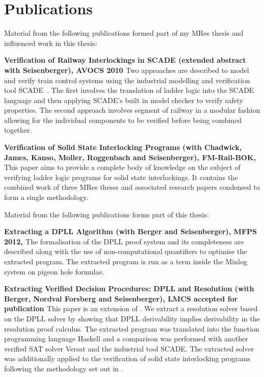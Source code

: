 \section{Publications}
Material from the following publications formed part of my MRes thesis and influenced work in this thesis:

\textbf{Verification of Railway Interlockings in SCADE (extended abstract with Seisenberger), AVOCS 2010 \cite{AL10}} 
Two approaches are described to model and verify train control systems using the industrial modelling and verification tool SCADE~\cite{Scade}. The first involves the translation of ladder logic into the SCADE language and then applying SCADE's built in model checker to verify safety properties. The second approach involves segment of railway in a modular fashion allowing for the individual components to be verified before being combined together.


\textbf{Verification of Solid State Interlocking Programs (with Chadwick, James, Kanso, Moller, Roggenbach and Seisenberger), FM-Rail-BOK, \cite{AL14a}}
This paper aims to provide a complete body of knowledge on the subject of verifying ladder logic programs for solid state interlockings. It contains the combined work of three MRes theses and associated research papers condensed to form a single methodology.

Material from the following publications forms part of this thesis:

\textbf{Extracting a DPLL Algorithm (with Berger and Seisenberger), MFPS 2012, \cite{AL12}}
The formalisation of the DPLL proof system and its completeness are described along with the use of non-computational quantifiers to optimise the extracted program. The extracted program is run as a term inside the Minlog system on pigeon hole formulae.


\textbf{Extracting Verified Decision Procedures: DPLL and Resolution (with Berger, Nordval Forsberg and Seisenberger), LMCS accepted for publication \cite{AL14b}}
This paper is an extension of \cite{AL12}. We extract a resolution solver based on the DPLL solver by showing that DPLL derivability implies derivability in the resolution proof calculus. The extracted program was translated into the function programming language Haskell and a comparison was performed with another verified SAT solver Versat and the industrial tool SCADE. The extracted solver was additionally applied to the verification of solid state interlocking programs following the methodology set out in \cite{AL14a}.



